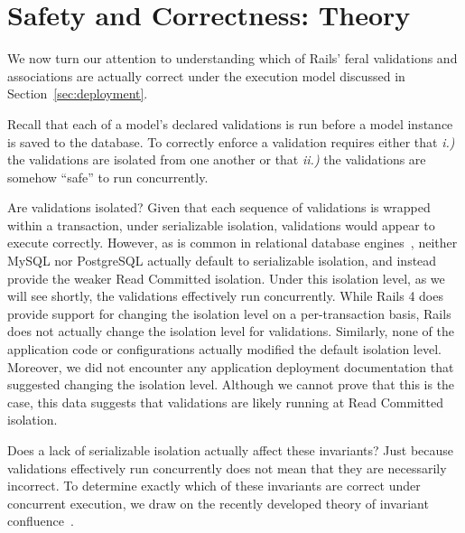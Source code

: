 
\section{Safety and Correctness: Theory}
\label{sec:apps}

We now turn our attention to understanding which of Rails' feral
validations and associations are actually correct under the execution
model discussed in Section~\ref{sec:deployment}. 

Recall that each of a model's declared validations is run before a model instance is saved to
the database. To correctly enforce a validation requires either that
\textit{i.)} the validations are isolated from one another or
that \textit{ii.)} the validations are somehow ``safe'' to run
concurrently.

Are validations isolated? Given that each sequence of
validations is wrapped within a transaction, under serializable
isolation, validations would appear to execute correctly. However, as
is common in relational database engines~\cite{hat-vldb}, neither
MySQL nor PostgreSQL actually default to serializable isolation, and
instead provide the weaker Read Committed isolation. Under this
isolation level, as we will see shortly, the validations effectively
run concurrently. While Rails 4 does provide support for changing the
isolation level on a per-transaction basis, Rails does not actually
change the isolation level for validations. Similarly, none of the
application code or configurations actually modified the default
isolation level. Moreover, we did not encounter any application
deployment documentation that suggested changing the isolation
level. Although we cannot prove that this is the case, this data
suggests that validations are likely running at Read Committed
isolation.

Does a lack of serializable isolation actually affect these
invariants? Just because validations effectively run concurrently does
not mean that they are necessarily incorrect. To determine exactly
which of these invariants are correct under concurrent execution, we
draw on the recently developed theory of invariant
confluence~\cite{coord-avoid}.

